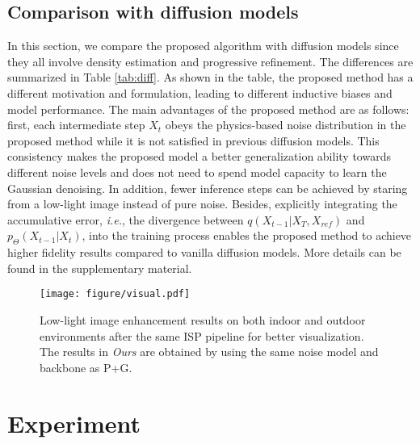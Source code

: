 \documentclass[10pt,twocolumn,letterpaper]{article}
\def\ie{\textit{i.e.}}
\def\p{p_\Theta}
\begin{document}
\subsection{Comparison with diffusion models}
In this section, we compare the proposed algorithm with diffusion models \cite{song2020denoising, ho2020denoising, saharia2022image} since they all involve density estimation and progressive refinement. The differences are summarized in Table \ref{tab:diff}. As shown in the table, the proposed method has a different motivation and formulation, leading to different inductive biases and model performance. The main advantages of the proposed method are as follows: first, each intermediate step $X_t$ obeys the physics-based noise distribution in the proposed method while it is not satisfied in previous diffusion models. 
This consistency makes the proposed model a better generalization ability towards different noise levels and does not need to spend model capacity to learn the Gaussian denoising. 
In addition, fewer inference steps can be achieved by staring from a low-light image instead of pure noise.
Besides, explicitly integrating the accumulative error, \ie, the divergence between $q(X_{t-1}|X_T, X_{ref})$ and $\p(X_{t-1}|X_t)$, into the training process enables the proposed method to achieve higher fidelity results compared to vanilla diffusion models. More details can be found in the supplementary material.
 
\begin{figure*}[t]
    \centering
\texttt{[image: figure/visual.pdf]} 
    \vspace{-0.45cm}
    \caption{Low-light image enhancement results on both indoor and outdoor environments after the same ISP pipeline for better visualization. The results in \textit{Ours} are obtained by using the same noise model and backbone as P+G. }
    \label{fig:vis_res}
\end{figure*}

\vspace{-0.1cm}
\section{Experiment}
\vspace{-0.1cm}
\end{document}
